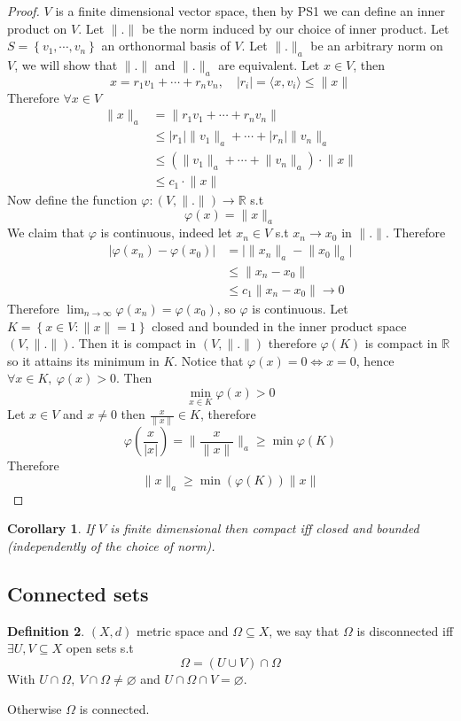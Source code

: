 \documentclass[11pt,a4paper]{article}
\theoremstyle{definition}
\newtheorem{definition}{Definition}[section]
\theoremstyle{plain}
\newtheorem{corollary}[definition]{Corollary}
\theoremstyle{remark}
\newcommand{\R}{\mathbb{R}}
\renewcommand{\set}[1]{\left\{ #1 \right\}}
\newcommand{\angles}[1]{\langle #1 \rangle}
\newcommand{\abs}[1]{\lvert #1 \rvert}
\newcommand{\norm}[1]{\lVert #1 \rVert}
\begin{document}
\begin{proof}
    $V$ is a finite dimensional vector space, then by PS1 we can define an inner product on $V$. Let $\norm{.}$ be the norm induced 
    by our choice of inner product. Let $S = \set{v_1, \cdots, v_n}$ an orthonormal basis of $V$. Let $\norm{.}_a$ be an arbitrary norm on $V$, 
    we will show that $\norm{.}$ and $\norm{.}_a$ are equivalent. Let $x \in V$, then 
    $$x = r_1 v_1 + \cdots + r_n v_n, \quad |r_i| = \angles{x, v_i} \le \norm{x}$$
    Therefore $\forall x \in V$
    \begin{align*}
        \norm{x}_a &= \norm{r_1 v_1 + \cdots + r_n v_n} \\
        &\le |r_1| \norm{v_1}_a + \cdots + |r_n| \norm{v_n}_a \\
        &\le (\norm{v_1}_a + \cdots + \norm{v_n}_a) \cdot \norm{x} \\
        &\le c_1 \cdot \norm{x}
    \end{align*}
    Now define the function $\varphi \colon (V, \norm{.}) \to \R$ s.t 
    $$\varphi(x) = \norm{x}_a$$
    We claim that $\varphi$ is continuous, indeed let $x_n \in V$ s.t $x_n \to x_0$ in $\norm{.}$. Therefore 
    \begin{align*}
        \abs{\varphi(x_n) - \varphi(x_0)} &= \abs{\norm{x_n}_a - \norm{x_0}_a} \\
        &\le \norm{x_n - x_0} \\
        &\le c_1 \norm{x_n - x_0} \to 0
    \end{align*}  
    Therefore $\lim_{n \to \infty} \varphi(x_n) = \varphi(x_0)$, so $\varphi$ is continuous. 
    Let $K = \set{x \in V \colon \norm{x} = 1}$ closed and bounded in the inner product space $(V, \norm{.})$. Then it is compact in 
    $(V, \norm{.})$ therefore $\varphi(K)$ is compact in $\R$ so it attains its minimum in $K$. Notice that $\varphi(x) = 0 \iff x = 0$, hence 
    $\forall x \in K, \ \varphi(x) > 0$. Then 
    $$\min_{x \in K} \varphi(x) > 0$$
    Let $x \in V$ and $x \ne 0$ then $\frac{x}{\norm{x}} \in K$, therefore 
    $$\varphi(\frac{x}{|x|}) = \norm{\frac{x}{\norm{x}}}_a \ge \min \varphi(K)$$
    Therefore 
    $$\norm{x}_a \ge \min (\varphi(K)) \norm{x}$$
\end{proof}

\begin{corollary}
    If $V$ is finite dimensional then compact iff closed and bounded (independently of the choice of norm).
\end{corollary}

\subsection{Connected sets} 
\begin{definition}
    $(X,d)$ metric space and $\Omega \subseteq X$, we say that $\Omega$ is disconnected iff $\exists U, V \subseteq X$ open sets s.t 
    $$\Omega = (U \cup V) \cap \Omega$$
    With $U \cap \Omega, \ V \cap \Omega \ne \varnothing$ and $U \cap \Omega \cap V = \varnothing$. 

    Otherwise $\Omega$ is connected. 
\end{definition}
\end{document}
